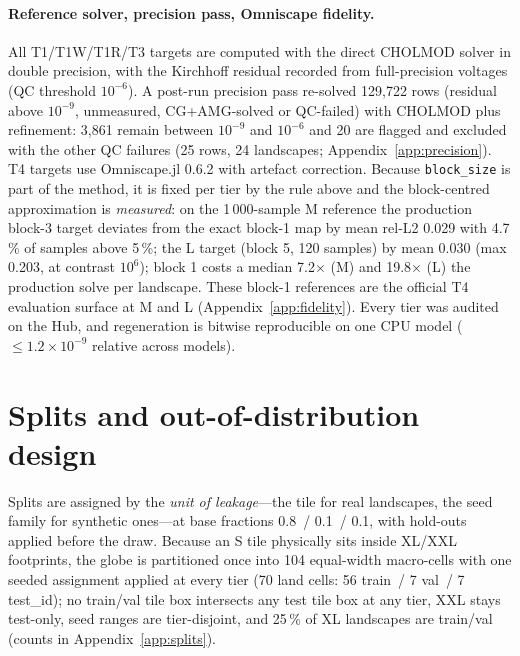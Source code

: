 \documentclass{article}
\newcommand{\relltwo}{rel-L2}
\newcommand{\code}[1]{\texttt{#1}}
\begin{document}
\paragraph{Reference solver, precision pass, Omniscape fidelity.} All T1/T1W/T1R/T3 targets are computed with the direct CHOLMOD solver in double precision, with the Kirchhoff residual recorded from full-precision voltages (QC threshold $10^{-6}$). A post-run precision pass re-solved 129,722 rows (residual above $10^{-9}$, unmeasured, CG+AMG-solved or QC-failed) with CHOLMOD plus refinement: 3,861 remain between $10^{-9}$ and $10^{-6}$ and 20 are flagged and excluded with the other QC failures (25 rows, 24 landscapes; Appendix~\ref{app:precision}). T4 targets use Omniscape.jl 0.6.2 with artefact correction. Because \code{block\_size} is part of the method, it is fixed per tier by the rule above and the block-centred approximation is \emph{measured}: on the 1\,000-sample M reference the production block-3 target deviates from the exact block-1 map by mean \relltwo{} 0.029 with 4.7\,\% of samples above 5\,\%; the L target (block 5, 120 samples) by mean 0.030 (max 0.203, at contrast $10^6$); block 1 costs a median 7.2$\times$ (M) and 19.8$\times$ (L) the production solve per landscape. These block-1 references are the official T4 evaluation surface at M and L (Appendix~\ref{app:fidelity}). Every tier was audited on the Hub, and regeneration is bitwise reproducible on one CPU model ($\le 1.2\times 10^{-9}$ relative across models).

\section{Splits and out-of-distribution design}
\label{sec:splits}

Splits are assigned by the \emph{unit of leakage}---the tile for real landscapes, the seed family for synthetic ones---at base fractions 0.8~/ 0.1~/ 0.1, with hold-outs applied before the draw. Because an S tile physically sits inside XL/XXL footprints, the globe is partitioned once into 104 equal-width macro-cells with one seeded assignment applied at every tier (70 land cells: 56 train~/ 7 val~/ 7 test\_id); no train/val tile box intersects any test tile box at any tier, XXL stays test-only, seed ranges are tier-disjoint, and 25\,\% of XL landscapes are train/val (counts in Appendix~\ref{app:splits}).
\end{document}
